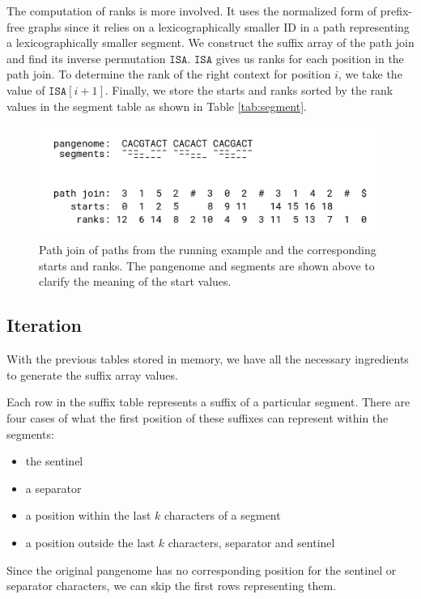The computation of ranks is more involved.
It uses the normalized form of prefix-free graphs since it relies on a lexicographically smaller ID in a path representing a lexicographically smaller segment.
We construct the suffix array of the path join and find its inverse permutation $\texttt{ISA}$.
$\texttt{ISA}$ gives us ranks for each position in the path join.
To determine the rank of the right context for position $i$, we take
the value of $\texttt{ISA}[i+1]$.
Finally, we store the starts and ranks sorted by the rank values in the segment table as shown in Table \ref{tab:segment}.

\begin{figure}
    \centering
    \includegraphics[width=\linewidth]{images/path_join.png}
    \caption{
        Path join of paths from the running example and the corresponding starts and ranks. The pangenome and segments are shown above to clarify the meaning of the start values.
    }
    \label{fig:path_join}
\end{figure}

\subsection{Iteration}
With the previous tables stored in memory, we have all the necessary ingredients to generate the suffix array values.

Each row in the suffix table represents a suffix of a particular segment.
There are four cases of what the first position of these suffixes can represent within the segments:
\begin{itemize}
    \item the sentinel
    \item a separator
    \item a position within the last $k$ characters of a segment
    \item a position outside the last $k$ characters, separator and sentinel
\end{itemize}

Since the original pangenome has no corresponding position for the sentinel or separator characters, we can skip the first rows representing them.

